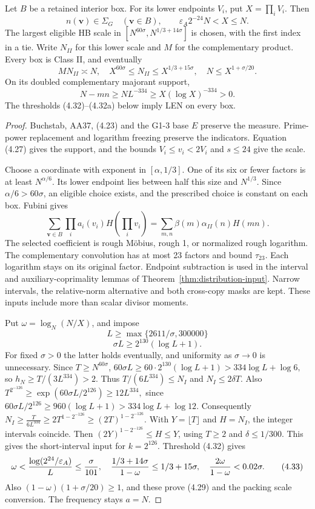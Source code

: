 \begin{lemma}\label{lem:g1-f}
Let $B$ be a retained interior box.
For its lower endpoints $V_i$, put $X=\prod_iV_i$.
Then
\[
 n(\mathbf v)\in\Sigma_G\quad(\mathbf v\in B),\qquad
 \varepsilon_A2^{-24}N<X\le N.
 \tag{4.28}
\]
The largest eligible HB scale in
$[N^{60\sigma},N^{1/3+14\sigma}]$ is chosen, with the first index in a tie.
Write $N_{II}$ for this lower scale and $M$ for the complementary product.
Every box is Class II, and eventually
\[
 MN_{II}\asymp N,\quad
 X^{60\sigma}\le N_{II}\le X^{1/3+15\sigma},\quad
 N\le X^{1+\sigma/20}.
 \tag{4.29}
\]
On its doubled complementary majorant support,
\[
 N-mn\ge NL^{-334}\ge X(\log X)^{-334}>0.
 \tag{4.30}
\]
The thresholds (4.32)--(4.32a) below imply LEN on every box.
\end{lemma}
\begin{proof}
Buchstab, AA37, (4.23) and the G1-3 base $E$ preserve the measure.
Prime-power replacement and logarithm freezing preserve the indicators.
Equation (4.27) gives the support, and the bounds $V_i\le v_i<2V_i$ and $s\le24$ give the scale.

Choose a coordinate with exponent in $[\alpha,1/3]$.
One of its six or fewer factors is at least $N^{\alpha/6}$.
Its lower endpoint lies between half this size and $N^{1/3}$.
Since $\alpha/6>60\sigma$, an eligible choice exists, and the prescribed choice is constant on each box.
Fubini gives
\[
 \sum_{\mathbf v\in B}\prod_ia_i(v_i)H(\prod_iv_i)
       =\sum_{m,n}\beta(m)\alpha_{II}(n)H(mn).
 \tag{4.31}
\]
The selected coefficient is rough Möbius, rough 1, or normalized rough logarithm.
The complementary convolution has at most 23 factors and bound $\tau_{23}$.
Each logarithm stays on its original factor.
Endpoint subtraction is used in the interval and auxiliary-coprimality lemmas of Theorem~\ref{thm:distribution-input}.
Narrow intervals, the relative-norm alternative and both cross-copy masks are kept.
These inputs include more than scalar divisor moments.

Put $\omega=\log_N(N/X)$, and impose
\[
 L\ge\max\{2611/\sigma,300000\}
 \tag{4.32}
\]
\[
 \sigma L\ge2^{130}(\log L+1).
 \tag{4.32a}
\]
For fixed $\sigma>0$ the latter holds eventually, and uniformity as $\sigma\to0$ is unnecessary.
Since $T\ge N^{60\sigma}$,
$60\sigma L\ge60\cdot2^{130}(\log L+1)
              >334\log L+\log6,$
so $h_N\ge T/(3L^{334})>2$.
Thus $T/(6L^{334})\le N_I$ and $N_I\le2\delta T$.
Also
$T^{2^{-126}}\ge\exp(60\sigma L/2^{126})\ge12L^{334},$
since $60\sigma L/2^{126}\ge960(\log L+1)>334\log L+\log12$.
Consequently
$N_I\ge\frac{T}{6L^{334}}
       \ge2T^{1-2^{-126}}\ge(2T)^{1-2^{-126}}.$
With $Y=\lfloor T\rfloor$ and $H=N_I$, the integer intervals coincide.
Then $(2Y)^{1-2^{-126}}\le H\le Y$, using $T\ge2$ and $\delta\le1/300$.
This gives the short-interval input for $k=2^{126}$.
Threshold (4.32) gives
\[
 \omega<{\log(2^{24}/\varepsilon_A)\over L}\le{\sigma\over101},
 \quad {1/3+14\sigma\over1-\omega}\le1/3+15\sigma,\quad
 {2\omega\over1-\omega}<0.02\sigma.
 \tag{4.33}
\]
Also $(1-\omega)(1+\sigma/20)\ge1$, and these prove (4.29) and the packing scale conversion.
The frequency stays $a=N$.


\end{proof}
